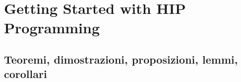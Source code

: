 \chapter{Getting Started with HIP Programming}
\section{Teoremi, dimostrazioni, proposizioni, lemmi, corollari}
